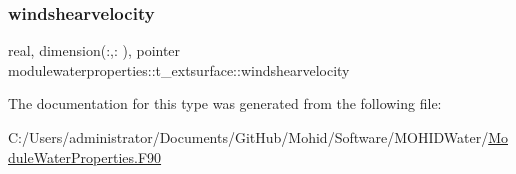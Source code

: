 \subsubsection{\texorpdfstring{windshearvelocity}{windshearvelocity}}
{\footnotesize\ttfamily real, dimension(\+:,\+:  ), pointer modulewaterproperties\+::t\+\_\+extsurface\+::windshearvelocity\hspace{0.3cm}{\ttfamily [private]}}



The documentation for this type was generated from the following file\+:\begin{DoxyCompactItemize}
\item 
C\+:/\+Users/administrator/\+Documents/\+Git\+Hub/\+Mohid/\+Software/\+M\+O\+H\+I\+D\+Water/\mbox{\hyperlink{_module_water_properties_8_f90}{Module\+Water\+Properties.\+F90}}\end{DoxyCompactItemize}
